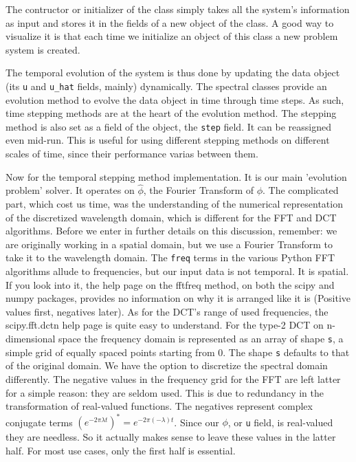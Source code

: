 \documentclass[11pt,a4paper]{report}
\begin{document}
The contructor or initializer of the class simply takes all the system's information as input and stores it in the fields of a new object of the class.
A good way to visualize it is that each time we initialize an object of this class a new problem system is created.

The temporal evolution of the system is thus done by updating the data object (its \verb`u` and \verb`u_hat` fields, mainly) dynamically.
The spectral classes provide an evolution method to evolve the data object in time through time steps.
As such, time stepping methods are at the heart of the evolution method.
The stepping method is also set as a field of the object, the \verb`step` field.
It can be reassigned even mid-run.
This is useful for using different stepping methods on different scales of time, since their performance varias between them.


Now for the temporal stepping method implementation.
It is our main 'evolution problem' solver.
It operates on $\hat{\phi}$, the Fourier Transform of $\phi$.
The complicated part, which cost us time,
was the understanding of the numerical representation of the discretized wavelength domain,
which is different for the FFT and DCT algorithms.
Before we enter in further details on this discussion, remember:
we are originally working in a spatial domain,
but we use a Fourier Transform to take it to the wavelength domain.
The \verb`freq` terms in the various Python FFT algorithms allude to frequencies, but our input data is not temporal.
It is spatial.
If you look into it, the help page on the fftfreq method,
on both the scipy and numpy packages,
provides no information on why it is arranged like it is (Positive values first, negatives later).
As for the DCT's range of used frequencies, the scipy.fft.dctn help page is quite easy to understand.
For the type-2 DCT on n-dimensional space the frequency domain is represented as an array of shape \verb`s`,
a simple grid of equally spaced points starting from 0.
The shape \verb`s` defaults to that of the original domain.
We have the option to discretize the spectral domain differently.
The negative values in the frequency grid for the FFT are left latter for a simple reason: they are seldom used.
This is due to redundancy in the transformation of real-valued functions.
The negatives represent complex conjugate terms
$(e^{-2 \pi \lambda t})^* = e^{-2 \pi (-\lambda) t}$.
Since our $\phi$, or \verb`u` field, is real-valued they are needless.
So it actually makes sense to leave these values in the latter half.
For most use cases, only the first half is essential.
\end{document}
